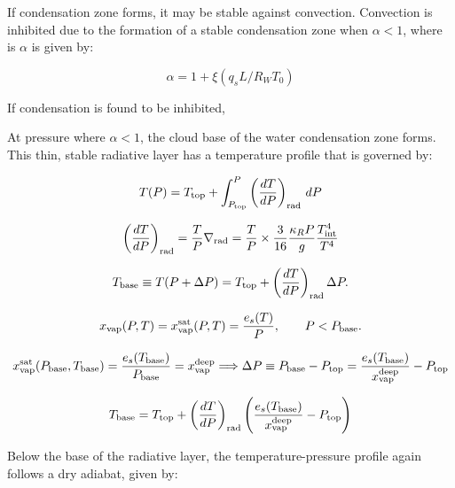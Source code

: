 \documentclass[11pt]{ucscthesisbs}
\begin{document}
If condensation zone forms, it may be stable against convection. Convection is inhibited due to the formation of a stable condensation zone when $\alpha < 1$, where is $\alpha$ \citep{friedson_2017} is given by:

\begin{equation}
  \alpha = 1 + \xi (q_{s} L / R_{W} T_{0}) 
\end{equation}

If condensation is found to be inhibited,  

At pressure where $\alpha < 1$, the cloud base of the water condensation zone forms. This thin, stable radiative layer has a temperature profile that is governed by:

\begin{equation}
	T(P) = T_{\rm top} + \int_{P_{\rm top}}^P\left(\frac{dT}{dP}\right)_{\rm rad}\,d P
\end{equation}

\begin{equation}
  \left(\frac{dT}{dP}\right)_{\rm rad}=\frac{T}{P}\nabla_{\rm rad} = \frac{T}{P}\times\frac{3}{16}\frac{\kappa_R P}{g}\frac{T_{\rm int}^4}{T^4}
\end{equation}

\begin{equation}
	T_{\rm base}\equiv T(P+\Delta P) = T_{\rm top} + \left(\frac{dT}{dP}\right)_{\rm rad}\Delta P.
\end{equation}

\begin{equation}
	x_{\rm vap}(P, T) = x_{\rm vap}^{\rm sat}(P, T) = \frac{e_s(T)}{P}, \qquad P<P_{\rm base}.
\end{equation}

\begin{equation}
x_{\rm vap}^{\rm sat}(P_{\rm base}, T_{\rm base}) = \frac{e_s(T_{\rm base})}{P_{\rm base}}=x_{\rm vap}^{\rm deep}
\Longrightarrow \Delta P \equiv P_{\rm base}-P_{\rm top} = \frac{e_s(T_{\rm base})}{x_{\rm vap}^{\rm deep}} - P_{\rm top}
\end{equation}

\begin{equation}
	T_{\rm base} = T_{\rm top} + \left(\frac{dT}{dP}\right)_{\rm rad}\left(\frac{e_s(T_{\rm base})}{x_{\rm vap}^{\rm deep}} - P_{\rm top}\right)
\end{equation}

Below the base of the radiative layer, the temperature-pressure profile again follows a dry adiabat, given by:
\end{document}
